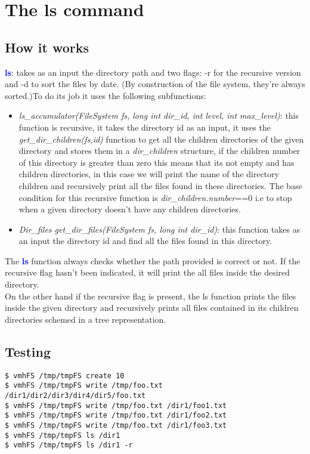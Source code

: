 \section{The ls command}

\subsection{How it works}
\textbf{\textcolor{blue}{ls}}: takes as an input the directory path and two flags: -r for the recursive version and -d to sort the files by date. (By construction of the file system, they're always sorted.)To do its job it uses the following subfunctions:\\

\begin{itemize}
\item \textit {ls\_accumulator(FileSystem fs, long int dir\_id, int level, int max\_level)}: this function is recursive, it takes the directory id as an input, it uses the \textit{get\_dir\_children(fs,id)} function to get all the children directories of the given directory and stores them in a \textit{dir\_children} structure, if the children number of this directory is greater than zero this means that its not empty and has children directories, in this case we will print the name of the directory children and recursively print all the files found in these directories. 
The base condition for this recursive function is \textit{dir\_children.number}==0 i.e to stop when a given directory doesn't have any children directories.\\

\item \textit{Dir\_files get\_dir\_files(FileSystem fs, long int dir\_id)}: this function takes as an input the directory id and find all the files found in this directory.
\end{itemize}
The \textbf{\textcolor{blue}{ls}} function always checks whether the path provided is correct or not. If the recursive flag hasn’t been indicated, it will print the all files inside the desired directory. \\

On the other hand if the recursive flag is present, the ls function prints the files inside the given directory and recursively prints all files  contained in its children directories schemed in a tree representation. \\


\newpage
\subsection{Testing}
\begin{lstlisting}
$ vmhFS /tmp/tmpFS create 10
$ vmhFS /tmp/tmpFS write /tmp/foo.txt /dir1/dir2/dir3/dir4/dir5/foo.txt
$ vmhFS /tmp/tmpFS write /tmp/foo.txt /dir1/foo1.txt
$ vmhFS /tmp/tmpFS write /tmp/foo.txt /dir1/foo2.txt
$ vmhFS /tmp/tmpFS write /tmp/foo.txt /dir1/foo3.txt
$ vmhFS /tmp/tmpFS ls /dir1
$ vmhFS /tmp/tmpFS ls /dir1 -r
\end{lstlisting}

